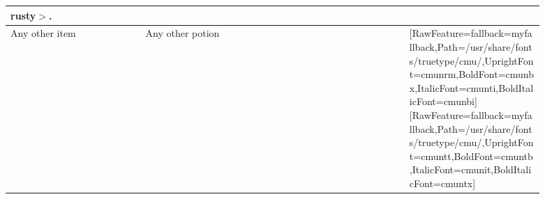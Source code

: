 {\begin{longtable}{|>{\RaggedRight}p{0.22292\linewidth}|>{\RaggedRight}p{0.22292\linewidth}|>{\RaggedRight}p{0.21694\linewidth}|>{\RaggedRight}p{0.22292\linewidth}|}
rusty{\mbox{$>$}}.}\allowbreak{}\setmainfont{cmunrm.ttf}[RawFeature={fallback=myfallback},Path=/usr/share/fonts/truetype/cmu/,UprightFont=cmunrm,BoldFont=cmunbx,ItalicFont=cmunti,BoldItalicFont=cmunbi]\setmonofont{cmunrm.ttf}[RawFeature={fallback=myfallback},Path=/usr/share/fonts/truetype/cmu/,UprightFont=cmuntt,BoldFont=cmuntb,ItalicFont=cmunit,BoldItalicFont=cmuntx]\\ \hline \hspace*{0pt}\ignorespaces{}\hspace*{0pt}Any other item&\hspace*{0pt}\ignorespaces{}\hspace*{0pt}Any other potion&\hspace*{0pt}\ignorespaces{}\hspace*{0pt}&\hspace*{0pt}\ignorespaces{}\hspace*{0pt}{\bfseries \allowbreak{}\setmainfont{cmunbx.ttf}[RawFeature={fallback=myfallback},Path=/usr/share/fonts/truetype/cmu/,UprightFont=cmunrm,BoldFont=cmunbx,ItalicFont=cmunti,BoldItalicFont=cmunbi]\setmonofont{cmunbx.ttf}[RawFeature={fallback=myfallback},Path=/usr/share/fonts/truetype/cmu/,UprightFont=cmuntt,BoldFont=cmuntb,ItalicFont=cmunit,BoldItalicFont=cmuntx]\bfseries Interesting...}\allowbreak{}\setmainfont{cmunrm.ttf}[RawFeature={fallback=myfallback},Path=/usr/share/fonts/truetype/cmu/,UprightFont=cmunrm,BoldFont=cmunbx,ItalicFont=cmunti,BoldItalicFont=cmunbi]\setmonofont{cmunrm.ttf}[RawFeature={fallback=myfallback},Path=/usr/share/fonts/truetype/cmu/,UprightFont=cmuntt,BoldFont=cmuntb,ItalicFont=cmunit,BoldItalicFont=cmuntx]\\ \hline 
\end{longtable}
}
